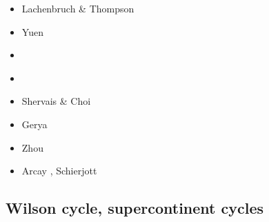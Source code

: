 \begin{scriptsize}
\begin{itemize}
\item[\nineteenseventytwo] Lachenbruch \& Thompson \cite{lath72}
\item[\nineteenseventyeight] Yuen \etal \cite{yufs78}
\item[\twothousandseven] \cite{macl07}
\item[\twothousandten] \cite{gerya2010}
\item[\twothousandtwelve] Shervais \& Choi \cite{shch12}
\item[\twothousandthirteen] Gerya \cite{gery13c}
\item[\twothousandeighteen] Zhou \etal \cite{zhlg18}
\item[\twothousandtwenty] Arcay \etal \cite{arla20}, Schierjott \etal \cite{sctr20}
\end{itemize}
\end{scriptsize}

\subsection{Wilson cycle, supercontinent cycles}

